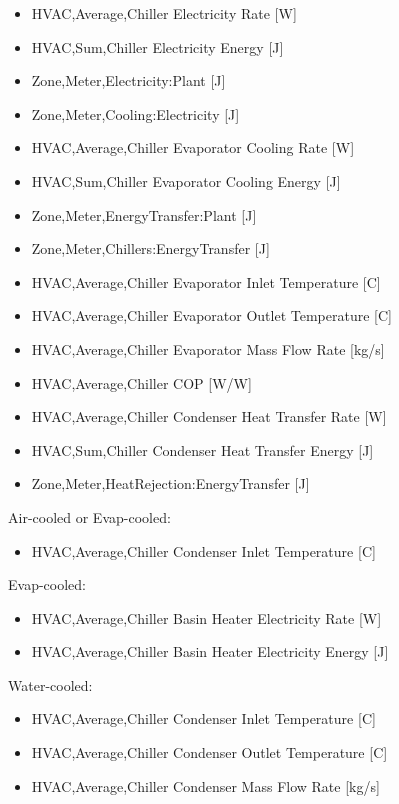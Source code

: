 \begin{itemize}
\item
  HVAC,Average,Chiller Electricity Rate {[}W{]}
\item
  HVAC,Sum,Chiller Electricity Energy {[}J{]}
\item
  Zone,Meter,Electricity:Plant {[}J{]}
\item
  Zone,Meter,Cooling:Electricity {[}J{]}
\item
  HVAC,Average,Chiller Evaporator Cooling Rate {[}W{]}
\item
  HVAC,Sum,Chiller Evaporator Cooling Energy {[}J{]}
\item
  Zone,Meter,EnergyTransfer:Plant {[}J{]}
\item
  Zone,Meter,Chillers:EnergyTransfer {[}J{]}
\item
  HVAC,Average,Chiller Evaporator Inlet Temperature {[}C{]}
\item
  HVAC,Average,Chiller Evaporator Outlet Temperature {[}C{]}
\item
  HVAC,Average,Chiller Evaporator Mass Flow Rate {[}kg/s{]}
\item
  HVAC,Average,Chiller COP {[}W/W{]}
\item
  HVAC,Average,Chiller Condenser Heat Transfer Rate {[}W{]}
\item
  HVAC,Sum,Chiller Condenser Heat Transfer Energy {[}J{]}
\item
  Zone,Meter,HeatRejection:EnergyTransfer {[}J{]}
\end{itemize}

Air-cooled or Evap-cooled:

\begin{itemize}
\tightlist
\item
  HVAC,Average,Chiller Condenser Inlet Temperature {[}C{]}
\end{itemize}

Evap-cooled:

\begin{itemize}
\item
  HVAC,Average,Chiller Basin Heater Electricity Rate {[}W{]}
\item
  HVAC,Average,Chiller Basin Heater Electricity Energy {[}J{]}
\end{itemize}

Water-cooled:

\begin{itemize}
\item
  HVAC,Average,Chiller Condenser Inlet Temperature {[}C{]}
\item
  HVAC,Average,Chiller Condenser Outlet Temperature {[}C{]}
\item
  HVAC,Average,Chiller Condenser Mass Flow Rate {[}kg/s{]}
\end{itemize}

